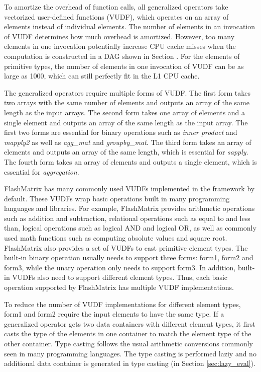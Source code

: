 To amortize the overhead of function calls, all generalized operators take
vectorized user-defined functions (VUDF), which operates on an array of elements
instead of individual elements. The number of elements in an invocation of
VUDF determines how much overhead is amortized. However, too many elements
in one invocation potentially increase CPU cache misses when the computation
is constructed in a DAG shown in Section {}. For the elements of primitive
types, the number of elements in one invocation of VUDF can be as large as 1000,
which can still perfectly fit in the L1 CPU cache.

The generalized operators require multiple forms of VUDF. The first form takes
two arrays with the same number of elements and outputs an array of the same
length as the input arrays. The second form takes one array of elements and
a single element and outputs an array of the same length as the input array.
The first two forms are essential for binary operations such as
\textit{inner product} and \textit{mapply2} as well as \textit{agg\_mat} and
\textit{groupby\_mat}.
The third form takes an array of elements and outputs an array of the same
length, which is essential for \textit{sapply}.
The fourth form takes an array of elements and outputs a single element,
which is essential for \textit{aggregation}.

FlashMatrix has many commonly used VUDFs implemented in the framework by default.
These VUDFs wrap basic operations built in many programming languages and
libraries. For example, FlashMatrix provides arithmetic operations such as addition
and subtraction, relational operations such as equal to and less than, logical
operations such as logical AND and logical OR, as well as commonly used
math functions such as computing absolute values and square root. FlashMatrix
also provides a set of VUDFs to cast primitive element types. The built-in
binary operation usually needs to support three forms: form1, form2 and form3,
while the unary operation only needs to support form3. In addition, built-in
VUDFs also need to support different element types. Thus, each basic operation
supported by FlashMatrix has multiple VUDF implementations.


To reduce the number of VUDF implementations for different element types, form1
and form2 require the input elements to have the same type. If a generalized
operator gets two data containers with different element types, it first casts
the type of the elements in one container to match the element type of the other
container. Type casting follows the usual arithmetic conversions \cite{}
commonly seen in many programming languages. The type casting is performed
laziy and no additional data container is generated in type casting
(in Section \ref{sec:lazy_eval}).

